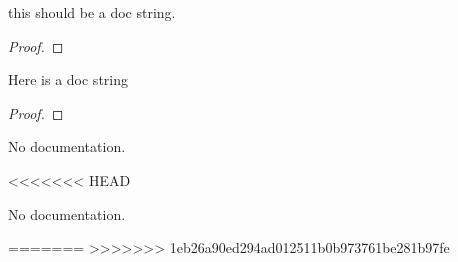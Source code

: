 
\begin{lemma}\label{List.aux}
        \leanok
                this should be a doc string.
    \end{lemma}

\begin{proof}
    \leanok
\end{proof}

\begin{theorem}\label{List.Nat.Ex}
        \leanok
                Here is a doc string
    \end{theorem}

\begin{proof}
    \leanok
\end{proof}

\begin{lemma}\label{List.test}
                No documentation.
    \end{lemma}

<<<<<<< HEAD
\begin{theorem}\label{List.Test}
                No documentation.
    \end{theorem}

=======
>>>>>>> 1eb26a90ed294ad012511b0b973761be281b97fe
